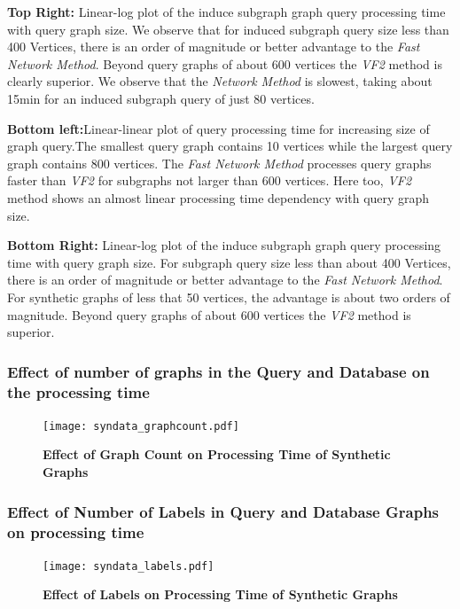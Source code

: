 \textbf{Top Right:} Linear-log plot of the induce subgraph graph query processing time with query graph size. We observe that for induced subgraph query size less than 400 Vertices, there is an order of magnitude or better advantage to the \textit{Fast Network Method}. Beyond query graphs of about 600 vertices the \textit{VF2} method is clearly superior. We observe that the \textit{Network Method} is slowest, taking about 15min for an induced subgraph query of just 80 vertices.

\textbf{ Bottom left:}Linear-linear plot of  query processing time for increasing size of graph query.The smallest query graph contains 10 vertices while the largest query graph contains 800 vertices. The \textit{Fast Network Method} processes query graphs faster than \textit{VF2} for subgraphs not larger than 600 vertices. Here too, \textit{VF2} method shows an almost linear processing time  dependency with query graph size.  

\textbf{Bottom Right:} Linear-log plot of the induce subgraph graph query processing time with query graph size. For subgraph query size less than about 400 Vertices, there is an order of magnitude or better advantage to the \textit{Fast Network Method}. For synthetic graphs of less that 50 vertices, the advantage is about two orders of magnitude. Beyond query graphs of about 600 vertices the \textit{VF2} method is superior.



\subsubsection{Effect of number of graphs in the Query and Database on the processing time}

\begin{figure}[H]
\centering
\texttt{[image: syndata\_graphcount.pdf]}
\caption{\textbf{Effect of Graph Count on Processing Time of Synthetic Graphs}} 
\label{fig:graphcount}
\end{figure}



\subsubsection{Effect of Number of Labels in Query and Database Graphs on processing time}

\begin{figure}[H]
\centering
\texttt{[image: syndata\_labels.pdf]}
\caption{\textbf{Effect of Labels on Processing Time of Synthetic Graphs}}
\label{fig:labels}
\end{figure}


